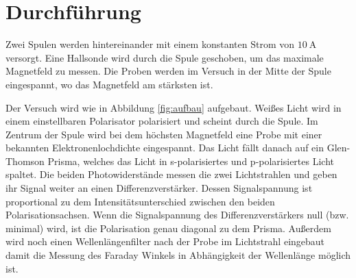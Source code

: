 






\section{Durchführung \cite{man}} %
Zwei Spulen werden hintereinander mit einem konstanten Strom von
$\qty{10}{\ampere}$ versorgt. Eine Hallsonde wird durch die Spule geschoben, um 
das maximale Magnetfeld zu messen. Die Proben werden im Versuch in der
Mitte der Spule eingespannt, wo das Magnetfeld am stärksten ist.

Der Versuch wird wie in Abbildung \ref{fig:aufbau} aufgebaut. Weißes Licht wird
in einem einstellbaren Polarisator polarisiert und scheint durch die Spule. Im
Zentrum der Spule wird bei dem höchsten Magnetfeld eine Probe mit einer
bekannten Elektronenlochdichte eingespannt. Das Licht fällt danach auf ein
Glen-Thomson Prisma, welches das Licht in s-polarisiertes und p-polarisiertes
Licht spaltet. Die beiden Photowiderstände messen die zwei Lichtstrahlen und
geben ihr Signal weiter an einen Differenzverstärker. Dessen Signalspannung ist
proportional zu dem Intensitätsunterschied zwischen den beiden
Polarisationsachsen. Wenn die Signalspannung des Differenzverstärkers null
(bzw. minimal) wird, ist die Polarisation genau diagonal zu dem Prisma.
Außerdem wird noch einen Wellenlängenfilter nach der Probe im Lichtstrahl
eingebaut damit die Messung des Faraday Winkels in Abhängigkeit der Wellenlänge
möglich ist.

